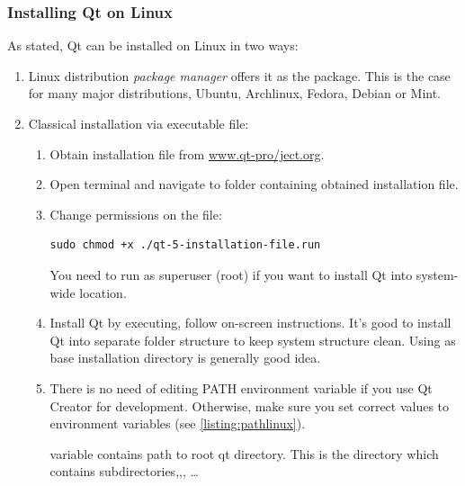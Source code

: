 \subsubsection{Installing Qt on Linux}
As stated, Qt can be installed on Linux in two ways:
\begin{enumerate}
\item Linux distribution \textit{package manager} offers it as the package. This is the case for many major distributions, \eg Ubuntu, Archlinux, Fedora, Debian or Mint.
\item Classical installation via executable file:
\begin{enumerate}
\item Obtain installation file from \href{http://www.qt-project.org/}{www.qt-pro\-/ject.org}.
\item Open terminal and navigate to folder containing obtained installation file.
\item Change permissions on the file:
\begin{lstlisting}[firstnumber=1,language=text]
sudo chmod +x ./qt-5-installation-file.run
\end{lstlisting}
You need to run as superuser (root) if you want to install Qt into system-wide location.

\item Install Qt by executing, follow on-screen instructions. It's good to install Qt into separate folder structure to keep system structure clean. Using as base installation directory is generally good idea.

\item There is no need of editing PATH environment variable if you use Qt Creator for development. Otherwise, make sure you set correct values to environment variables (see \autoref{listing:pathlinux}).
 variable contains path to root qt directory. This is the directory which contains subdirectories,,, \ldots
\end{enumerate}
\end{enumerate}


